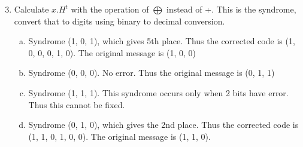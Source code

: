 \documentclass[xcolor=svgnames]{beamer}
\begin{document}
\begin{frame}{}
    \begin{enumerate}\setcounter{enumi}{2}
        \item Calculate $x.H^t$ with the operation of $\bigoplus$ instead of +. This is the syndrome, convert that to digits using binary to decimal conversion.
        \begin{enumerate}[a.]
            \item Syndrome (1, 0, 1), which gives 5th place. Thus the corrected code is (1, 0, 0, 0, 1, 0). The original message is (1, 0, 0)
            \item Syndrome (0, 0, 0). No error. Thus the original message is (0, 1, 1)
            \item Syndrome (1, 1, 1). This syndrome occurs only when 2 bits have error. Thus this cannot be fixed.
            \item Syndrome (0, 1, 0), which gives the 2nd place. Thus the corrected code is (1, 1, 0, 1, 0, 0). The original message is (1, 1, 0).
        \end{enumerate}
    \end{enumerate}
\end{frame}
\end{document}
